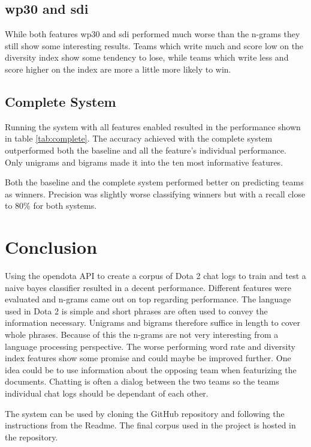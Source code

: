 \documentclass[12pt,a4paper]{article}
\begin{document}
\subsection{wp30 and sdi}
While both features wp30 and sdi performed much worse than the n-grams they still show some
interesting results.
Teams which write much and score low on the diversity index show some tendency to lose,
while teams which write less and score higher on the index are more a little more likely to win.


\subsection{Complete System}
Running the system with all features enabled resulted in the performance shown in table \ref{tab:complete}.
The accuracy achieved with the complete system outperformed both the baseline and all the feature's
individual performance.
Only unigrams and bigrams made it into the ten most informative features.

Both the baseline and the complete system performed better on predicting teams as winners.
Precision was slightly worse classifying winners but with a recall close to 80\% for both systems.

\section{Conclusion}
Using the opendota API to create a corpus of Dota 2 chat logs to train and test a naive bayes classifier
resulted in a decent performance.
Different features were evaluated and n-grams came out on top regarding performance.
The language used in Dota 2 is simple and short phrases are often used to convey the information necessary.
Unigrams and bigrams therefore suffice in length to cover whole phrases.
Because of this the n-grams are not very interesting from a language processing perspective.
The worse performing word rate and diversity index features show some promise and could maybe be improved
further.
One idea could be to use information about the opposing team when featurizing the documents.
Chatting is often a dialog between the two teams so the teams individual chat logs should be dependant
of each other.

The system can be used by cloning the GitHub repository and following the instructions from the Readme.
The final corpus used in the project is hosted in the repository.\cite{gitrepo}

\pagebreak


\end{document}
